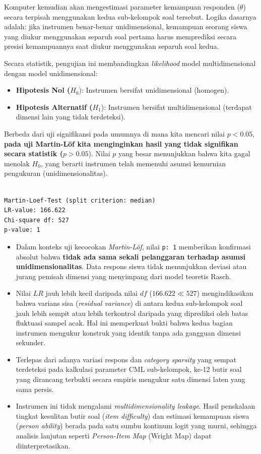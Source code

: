 \documentclass[
]{article}
\begin{document}
Komputer kemudian akan mengestimasi parameter kemampuan responden
(\(\theta\)) secara terpisah menggunakan kedua sub-kelompok soal
tersebut. Logika dasarnya adalah: jika instrumen benar-benar
unidimensional, kemampuan seorang siswa yang diukur menggunakan separuh
soal pertama harus memprediksi secara presisi kemampuannya saat diukur
menggunakan separuh soal kedua.

Secara statistik, pengujian ini membandingkan \emph{likelihood} model
multidimensional dengan model unidimensional:

\begin{itemize}
\item
  \textbf{Hipotesis Nol (}\(H_0\)): Instrumen bersifat unidimensional
  (homogen).
\item
  \textbf{Hipotesis Alternatif (}\(H_1\)): Instrumen bersifat
  multidimensional (terdapat dimensi lain yang tidak terdeteksi).
\end{itemize}

Berbeda dari uji signifikansi pada umumnya di mana kita mencari nilai
\(p < 0.05\), \textbf{pada uji Martin-Löf kita menginginkan hasil yang
tidak signifikan secara statistik (}\(p > 0.05\)). Nilai \(p\) yang
besar menunjukkan bahwa kita gagal menolak \(H_0\), yang berarti
instrumen telah memenuhi asumsi kemurnian pengukuran
(unidimensionalitas).

\begin{verbatim}

Martin-Loef-Test (split criterion: median)
LR-value: 166.622 
Chi-square df: 527 
p-value: 1 
\end{verbatim}

\begin{itemize}
\item
  Dalam konteks uji kecocokan \emph{Martin-Löf}, nilai \texttt{p:\ 1}
  memberikan konfirmasi absolut bahwa \textbf{tidak ada sama sekali
  pelanggaran terhadap asumsi unidimensionalitas}. Data respons siswa
  tidak menunjukkan deviasi atau jurang pemisah dimensi yang menyimpang
  dari model teoretis Rasch.
\item
  Nilai \(LR\) jauh lebih kecil daripada nilai \(df\)
  (\(166.622 \ll 527\)) mengindikasikan bahwa varians sisa
  (\emph{residual variance}) di antara kedua sub-kelompok soal jauh
  lebih sempit atau lebih terkontrol daripada yang diprediksi oleh batas
  fluktuasi sampel acak. Hal ini memperkuat bukti bahwa kedua bagian
  instrumen mengukur konstruk yang identik tanpa ada gangguan dimensi
  sekunder.
\item
  Terlepas dari adanya variasi respons dan \emph{category sparsity} yang
  sempat terdeteksi pada kalkulasi parameter CML sub-kelompok, ke-12
  butir soal yang dirancang terbukti secara empiris mengukur satu
  dimensi laten yang sama persis.
\item
  Instrumen ini tidak mengalami \emph{multidimensionality leakage}.
  Hasil penskalaan tingkat kesulitan butir soal (\emph{item difficulty})
  dan estimasi kemampuan siswa (\emph{person ability}) berada pada satu
  sumbu kontinum logit yang murni, sehingga analisis lanjutan seperti
  \emph{Person-Item Map} (Wright Map) dapat diinterpretasikan.
\end{itemize}
\end{document}
